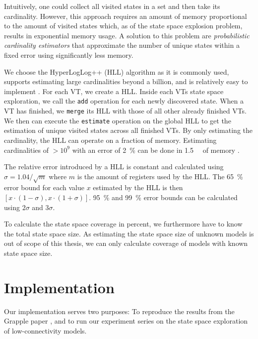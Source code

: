 \documentclass[
fancyheadings, %
%
%
]{stsreprt}
\begin{document}
Intuitively, one could collect all visited states in a set and then take its cardinality.
However, this approach requires an amount of memory proportional to the amount of visited states which, as of the state space explosion problem, results in exponential memory usage.
A solution to this problem are \emph{probabilistic cardinality estimators} that approximate the number of unique states within a fixed error using significantly less memory.

We choose the HyperLogLog++ (HLL) algorithm as it is commonly used, supports estimating large cardinalities beyond a billion, and is relatively easy to implement \cite{Heule2013.HyperLogLog++}.
For each VT, we create a HLL.
Inside each VTs state space exploration, we call the \texttt{add} operation for each newly discovered state.
When a VT has finished, we \texttt{merge} its HLL with those of all other already finished VTs.
We then can execute the \texttt{estimate} operation on the global HLL to get the estimation of unique visited states across all finished VTs.
By only estimating the cardinality, the HLL can operate on a fraction of memory.
Estimating cardinalities of $> 10^9$ with an error of \SI{2}{\percent} can be done in \SI{1.5}{\kilo\byte} of memory \cite{Flajolet2007.HyperLogLog}.

The relative error introduced by a HLL is constant and calculated using $\sigma=1.04 / \sqrt{m}$ where $m$ is the amount of registers used by the HLL.
The \SI{65}{\percent} error bound for each value $x$ estimated by the HLL is then $\left[x \cdot (1-\sigma), x \cdot (1+\sigma)\right]$.
\SI{95}{\percent} and \SI{99}{\percent} error bounds can be calculated using $2\sigma$ and $3\sigma$.

To calculate the state space coverage in percent, we furthermore have to know the total state space size.
As estimating the state space size of unknown models is out of scope of this thesis, we can only calculate coverage of models with known state space size.

\chapter{Implementation}
\label{chapter:implementation}

Our implementation serves two purposes:
To reproduce the results from the Grapple paper \cite{DeFrancisco2020.Grapple}, and to run our experiment series on the state space exploration of low-connectivity models.
\end{document}
